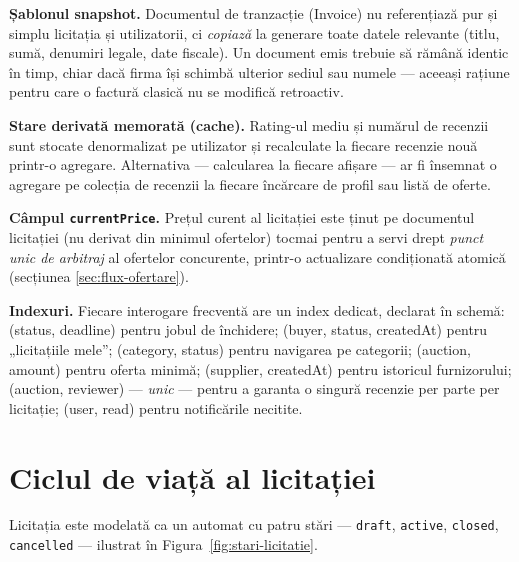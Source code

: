 \textbf{Șablonul snapshot.} Documentul de tranzacție (Invoice) nu referențiază pur și simplu licitația și utilizatorii, ci \textit{copiază} la generare toate datele relevante (titlu, sumă, denumiri legale, date fiscale). Un document emis trebuie să rămână identic în timp, chiar dacă firma își schimbă ulterior sediul sau numele --- aceeași rațiune pentru care o factură clasică nu se modifică retroactiv.

\textbf{Stare derivată memorată (cache).} Rating-ul mediu și numărul de recenzii sunt stocate denormalizat pe utilizator și recalculate la fiecare recenzie nouă printr-o agregare. Alternativa --- calcularea la fiecare afișare --- ar fi însemnat o agregare pe colecția de recenzii la fiecare încărcare de profil sau listă de oferte.

\textbf{Câmpul \texttt{currentPrice}.} Prețul curent al licitației este ținut pe documentul licitației (nu derivat din minimul ofertelor) tocmai pentru a servi drept \textit{punct unic de arbitraj} al ofertelor concurente, printr-o actualizare condiționată atomică (secțiunea \ref{sec:flux-ofertare}).

\textbf{Indexuri.} Fiecare interogare frecventă are un index dedicat, declarat în schemă: (status, deadline) pentru jobul de închidere; (buyer, status, createdAt) pentru „licitațiile mele''; (category, status) pentru navigarea pe categorii; (auction, amount) pentru oferta minimă; (supplier, createdAt) pentru istoricul furnizorului; (auction, reviewer) --- \textit{unic} --- pentru a garanta o singură recenzie per parte per licitație; (user, read) pentru notificările necitite.

\section{Ciclul de viață al licitației}
\label{sec:ciclu-viata}

Licitația este modelată ca un automat cu patru stări --- \texttt{draft}, \texttt{active}, \texttt{closed}, \texttt{cancelled} --- ilustrat în Figura~\ref{fig:stari-licitatie}.


